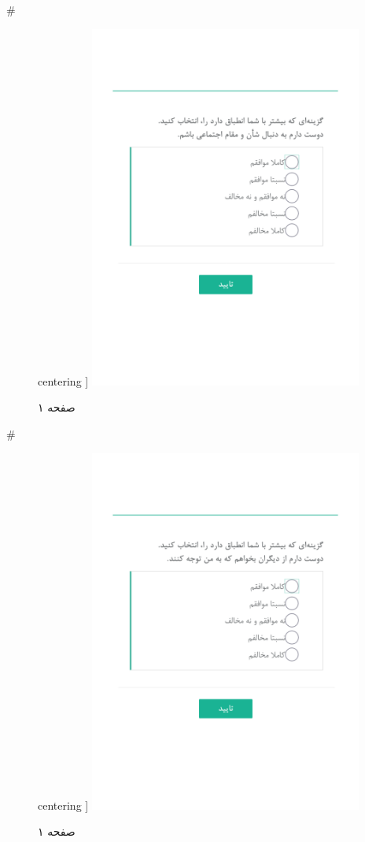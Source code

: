 { 
 # 
\begin{figure}[htpb]
centering ]
\includegraphics[width=0.8\textwidth]{./img/Task25.png/}
\caption{صفحه ۱}
\label{fig:Task1}
\end{figure}
 
 
 # 
\begin{figure}[htpb]
centering ]
\includegraphics[width=0.8\textwidth]{./img/Task26.png/}
\caption{صفحه ۱}
\label{fig:Task1}
\end{figure}
 
}

